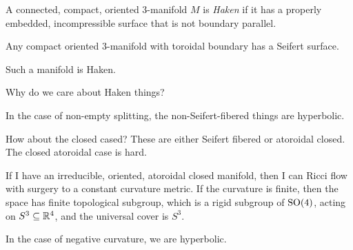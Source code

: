 \documentclass[a4paper]{article}
\begin{document}
\begin{defi}
  A connected, compact, oriented $3$-manifold $M$ is \emph{Haken} if it has a properly embedded, incompressible surface that is not boundary parallel.
\end{defi}

\begin{thm}[Seifert]
  Any compact oriented $3$-manifold with toroidal boundary has a Seifert surface.
\end{thm}

\begin{cor}
  Such a manifold is Haken.
\end{cor}

Why do we care about Haken things?
\begin{thm}
\end{thm}

\begin{cor}
  In the case of non-empty splitting, the non-Seifert-fibered things are hyperbolic.
\end{cor}

How about the closed cased? These are either Seifert fibered or atoroidal closed. The closed atoroidal case is hard.
\begin{thm}[Perelman, 2002--2003]
  If I have an irreducible, oriented, atoroidal closed manifold, then I can Ricci flow with surgery to a constant curvature metric. If the curvature is finite, then the space has finite topological subgroup, which is a rigid subgroup of $\mathrm{SO}(4)$, acting on $S^3 \subseteq \mathbb{R}^4$, and the universal cover is $S^3$.

  In the case of negative curvature, we are hyperbolic.
\end{thm}


\printindex
\end{document}
